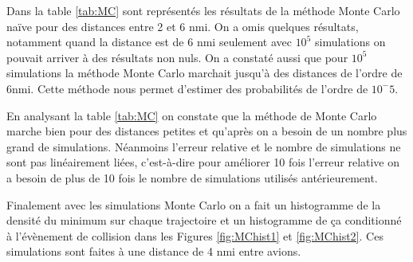 \documentclass[a4paper, 12pt,twoside]{article}
\numberwithin{equation}{subsection}
\begin{document}
	Dans la table \ref{tab:MC} sont représentés les résultats de la méthode Monte Carlo naïve pour des distances entre 2 et 6 nmi. On a omis quelques résultats, notamment quand la distance est de 6 nmi seulement avec $10^5$ simulations on pouvait arriver à des résultats non nuls. On a constaté aussi que pour $10^5$ simulations la méthode Monte Carlo marchait jusqu'à des distances de l'ordre de 6nmi. Cette méthode nous permet d'estimer des probabilités de l'ordre de $10^-5$.
	
	En analysant la table \ref{tab:MC} on constate que la méthode de Monte Carlo marche bien pour des distances petites et qu'après on a besoin de un nombre plus grand de simulations. Néanmoins l'erreur relative et le nombre de simulations ne sont pas linéairement liées, c'est-à-dire pour améliorer 10 fois l'erreur relative on a besoin de plus de 10 fois le nombre de simulations utilisés antérieurement.
	
	Finalement avec les simulations Monte Carlo on a fait un histogramme de la densité du minimum sur chaque trajectoire et un histogramme de ça conditionné à l'évènement de collision dans les Figures \ref{fig:MChist1} et \ref{fig:MChist2}. Ces simulations sont faites à une distance de 4 nmi entre avions.
	
\end{document}
